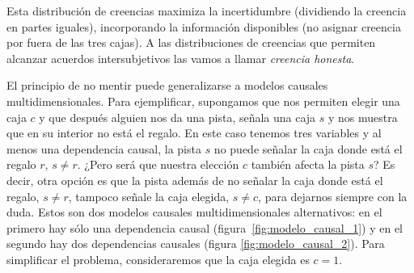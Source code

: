 \documentclass[a4paper,11pt]{book}
\theoremstyle{definition}
\begin{document}
%
Esta distribución de creencias maximiza la incertidumbre (dividiendo la creencia en partes iguales), incorporando la información disponibles (no asignar creencia por fuera de las tres cajas).
%
A las distribuciones de creencias que permiten alcanzar acuerdos intersubjetivos las vamos a llamar \emph{creencia honesta}.


El principio de no mentir puede generalizarse a modelos causales multidimensionales.
%
Para ejemplificar, supongamos que nos permiten elegir una caja $c$ y que despu\'es alguien nos da una pista, señala una caja $s$ y nos muestra que en su interior no está el regalo.
%
En este caso tenemos tres variables y al menos una dependencia causal, la pista $s$ no puede señalar la caja donde está el regalo $r$, $s \neq r$.
%
¿Pero ser\'a que nuestra elecci\'on $c$ tambi\'en afecta la pista $s$?
%
Es decir, otra opci\'on es que la pista adem\'as de no se\~nalar la caja donde est\'a el regalo, $s \neq r$, tampoco se\~nale la caja elegida, $s \neq c$, para dejarnos siempre con la duda.
%
Estos son dos modelos causales multidimensionales alternativos: en el primero hay s\'olo una dependencia causal (figura~\ref{fig:modelo_causal_1}) y en el segundo hay dos dependencias causales (figura \ref{fig:modelo_causal_2}).
%
Para simplificar el problema, consideraremos que la caja elegida es $c=1$.

\end{document}
